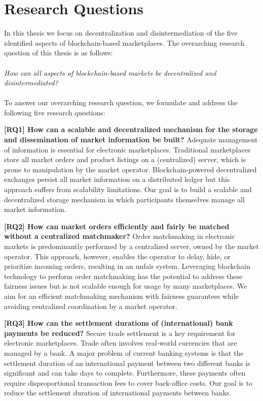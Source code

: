 \section{Research Questions}
\label{sec:research_questions}
In this thesis we focus on decentralization and disintermediation of the five identified aspects of blockchain-based marketplaces.
The overarching research question of this thesis is as follows:\\\\
\emph{How can all aspects of blockchain-based markets be decentralized and disintermediated?}\\\\
To answer our overarching research question, we formulate and address the following five research questions:

\textbf{[RQ1] How can a scalable and decentralized mechanism for the storage and dissemination of market information be built?}
Adequate management of information is essential for electronic marketplaces.
Traditional marketplaces store all market orders and product listings on a (centralized) server, which is prone to manipulation by the market operator.
Blockchain-powered decentralized exchanges persist all market information on a distributed ledger but this approach suffers from scalability limitations.
Our goal is to build a scalable and decentralized storage mechanism in which participants themselves manage all market information.

\textbf{[RQ2] How can market orders efficiently and fairly be matched without a centralized matchmaker?}
Order matchmaking in electronic markets is predominantly performed by a centralized server, owned by the market operator.
This approach, however, enables the operator to delay, hide, or prioritize incoming orders, resulting in an unfair system.
Leveraging blockchain technology to perform order matchmaking has the potential to address these fairness issues but is not scalable enough for usage by many marketplaces.
We aim for an efficient matchmaking mechanism with fairness guarantees while avoiding centralized coordination by a market operator.

\textbf{[RQ3] How can the settlement durations of (international) bank payments be reduced?}
Secure trade settlement is a key requirement for electronic marketplaces.
Trade often involves real-world currencies that are managed by a bank.
A major problem of current banking systems is that the settlement duration of an international payment between two different banks is significant and can take days to complete.
Furthermore, these payments often require disproportional transaction fees to cover back-office costs.
Our goal is to reduce the settlement duration of international payments between banks.

